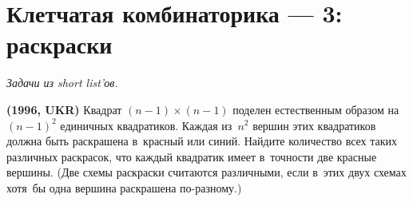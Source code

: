 
\section*{Клетчатая комбинаторика --- 3: раскраски}


\begingroup
\providecommand\ifincludesolutions{\iffalse}


\emph{Задачи из short list'ов.}

\ifincludesolutions
\textbf{Версия с решениями.}
\emph{Решения являются слабообработанным переводом с~английского.
Beware!}
\fi

\begin{problems}

\item\textbf{(1996, UKR)}
Квадрат $(n - 1) \times (n - 1)$ поделен естественным образом на~$(n - 1)^2$
единичных квадратиков.
Каждая из~$n^2$ вершин этих квадратиков должна быть раскрашена в~красный или
синий.
Найдите количество всех таких различных раскрасок, что каждый квадратик имеет
в~точности две красные вершины.
(Две схемы раскраски считаются различными, если в~этих двух схемах хотя~бы одна
вершина раскрашена по-разному.)

\end{problems}

\ifincludesolutions
Пусть вершинам в~нижнем ряду присвоена произвольная раскраска, и~предположим,
что некоторые две смежные вершины получили одинаковый цвет.
Количетво подобных раскрасок равно $2^n-2$.
Несложно увидеть, что тогда цвета оставшихся вершин получаются заданными
единственными образом, чтобы удовлетворить требованию.
Таким образом, в~этом случае $2^n-2$ возможных раскрасок.
\par
Далее, предположим, что вершины в~нижнем ряду раскрашены попеременно в~красный
и~синий.
Существует две подобных раскраски.
В~этом случае,то~же должно выполняться для каждого ряда, и~отсюда мы~получаем
$2^n$ возможных раскрасок.
\par
Отсюда следует, что полное число рассматриваемых раскрасок
$(2^n - 2) + 2^n = 2^{n+1} - 2$.
\fi %


